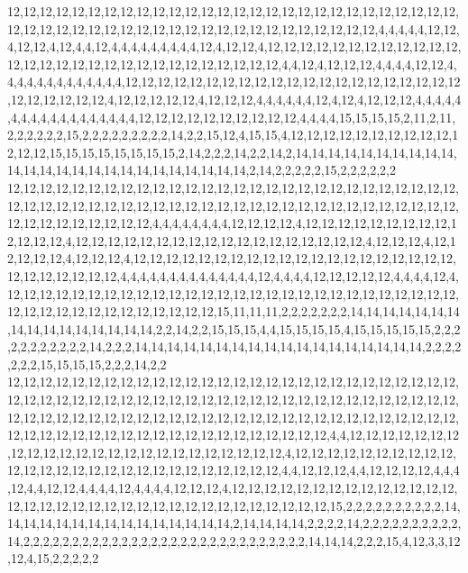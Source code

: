 12,12,12,12,12,12,12,12,12,12,12,12,12,12,12,12,12,12,12,12,12,12,12,12,12,12,12,12,12,12,12,12,12,12,12,12,12,12,12,12,12,12,12,12,12,12,12,12,12,12,12,4,4,4,4,4,12,12,4,12,12,4,12,4,4,12,4,4,4,4,4,4,4,4,4,12,4,12,12,4,12,12,12,12,12,12,12,12,12,12,12,12,12,12,12,12,12,12,12,12,12,12,12,12,12,12,12,12,12,4,4,12,4,12,12,12,4,4,4,4,12,12,4,4,4,4,4,4,4,4,4,4,4,4,4,12,12,12,12,12,12,12,12,12,12,12,12,12,12,12,12,12,12,12,12,12,12,12,12,12,12,12,4,12,12,12,12,12,4,12,12,12,4,4,4,4,4,4,12,4,12,4,12,12,12,4,4,4,4,4,4,4,4,4,4,4,4,4,4,4,4,4,4,12,12,12,12,12,12,12,12,12,12,4,4,4,4,15,15,15,15,2,11,2,11,2,2,2,2,2,2,15,2,2,2,2,2,2,2,2,2,14,2,2,15,12,4,15,15,4,12,12,12,12,12,12,12,12,12,12,12,12,12,15,15,15,15,15,15,15,15,2,14,2,2,2,14,2,2,14,2,14,14,14,14,14,14,14,14,14,14,14,14,14,14,14,14,14,14,14,14,14,14,14,14,14,2,14,2,2,2,2,2,15,2,2,2,2,2,2
12,12,12,12,12,12,12,12,12,12,12,12,12,12,12,12,12,12,12,12,12,12,12,12,12,12,12,12,12,12,12,12,12,12,12,12,12,12,12,12,12,12,12,12,12,12,12,12,12,12,12,12,12,12,12,12,12,12,12,12,12,12,12,12,12,4,4,4,4,4,4,4,4,12,12,12,12,4,12,12,12,12,12,12,12,12,12,12,12,12,12,4,12,12,12,12,12,12,12,12,12,12,12,12,12,12,12,12,12,12,4,12,12,12,4,12,12,12,12,12,4,12,12,12,4,12,12,12,12,12,12,12,12,12,12,12,12,12,12,12,12,12,12,12,12,12,12,12,12,12,12,12,4,4,4,4,4,4,4,4,4,4,4,4,4,4,12,4,4,4,4,12,12,12,12,12,4,4,4,4,12,4,12,12,12,12,12,12,12,12,12,12,12,12,12,12,12,12,12,12,12,12,12,12,12,12,12,12,12,12,12,12,12,12,12,12,12,12,12,12,12,12,12,15,11,11,11,2,2,2,2,2,2,2,14,14,14,14,14,14,14,14,14,14,14,14,14,14,14,14,2,2,14,2,2,15,15,15,4,4,15,15,15,15,4,15,15,15,15,15,2,2,2,2,2,2,2,2,2,2,2,14,2,2,2,14,14,14,14,14,14,14,14,14,14,14,14,14,14,14,14,14,14,2,2,2,2,2,2,2,15,15,15,15,2,2,2,14,2,2
12,12,12,12,12,12,12,12,12,12,12,12,12,12,12,12,12,12,12,12,12,12,12,12,12,12,12,12,12,12,12,12,12,12,12,12,12,12,12,12,12,12,12,12,12,12,12,12,12,12,12,12,12,12,12,12,12,12,12,12,12,12,12,12,12,12,12,12,12,12,12,12,12,12,12,12,12,12,12,12,12,12,12,12,12,12,12,12,12,12,12,12,12,12,12,12,12,12,12,12,12,12,12,12,4,4,12,12,12,12,12,12,12,12,12,12,12,12,12,12,12,12,12,12,12,12,12,12,12,12,4,12,12,12,12,12,12,12,12,12,12,12,12,12,12,12,12,12,12,12,12,12,12,12,12,12,12,12,4,4,12,12,12,4,4,12,12,12,12,4,4,4,12,4,4,12,12,4,4,4,4,12,4,4,4,4,12,12,12,4,12,12,12,12,12,12,12,12,12,12,12,12,12,12,12,12,12,12,12,12,12,12,12,12,12,12,12,12,12,12,12,12,12,12,15,2,2,2,2,2,2,2,2,2,2,14,14,14,14,14,14,14,14,14,14,14,14,14,14,14,2,14,14,14,14,2,2,2,2,14,2,2,2,2,2,2,2,2,2,2,14,2,2,2,2,2,2,2,2,2,2,2,2,2,2,2,2,2,2,2,2,2,2,2,2,2,2,2,2,2,14,14,14,2,2,2,15,4,12,3,3,12,12,4,15,2,2,2,2,2
